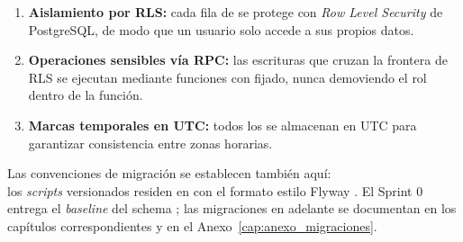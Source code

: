 \begin{enumerate}[noitemsep]
    \item \textbf{Aislamiento por RLS:} cada fila de  se protege con
    \textit{Row Level Security} de PostgreSQL, de modo que un usuario solo accede a sus
    propios datos.
    \item \textbf{Operaciones sensibles vía RPC:} las escrituras que cruzan la frontera de RLS
    se ejecutan mediante funciones  con  fijado,
    nunca demoviendo el rol dentro de la función.
    \item \textbf{Marcas temporales en UTC:} todos los  se almacenan en
    UTC para garantizar consistencia entre zonas horarias.
\end{enumerate}

Las convenciones de migración se establecen también aquí: \\ los \textit{scripts} versionados
residen en  con el formato estilo Flyway
. El Sprint 0 entrega el \textit{baseline} del schema
; las migraciones  en adelante se documentan en los capítulos
correspondientes y en el Anexo~\ref{cap:anexo_migraciones}.

\clearpage
